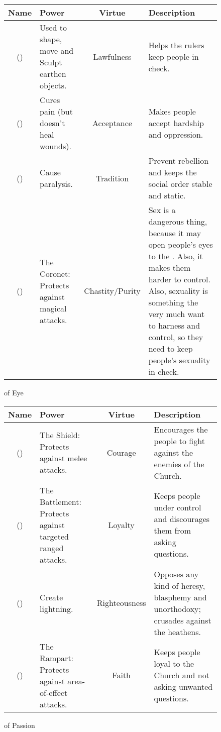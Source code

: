 \newcommand{\sephitem}[5]{#1 (#2) & #3 & #4 & #5 \\\hline}

\newenvironment{sephirahlist}[1]{%
  \begin{figure}
  \caption{\Sephiroth{} of #1}
  \begin{tabular}{|c|p{4cm}|c|p{6cm}|}
  \hline
  \textbf{Name} & \textbf{Power} & \textbf{Virtue} & \textbf{Description} 
  \\
  \hline
  \hline
}{%
  \end{tabular}
  \end{figure}
}





\begin{comment}
\subsubsection{Eye}
\end{comment}
\begin{sephirahlist}{Eye}
\sephitem
  {\Cushed}
  {\male}
  {Used to shape, move and Sculpt earthen objects.}
  {Lawfulness}
  {Helps the rulers keep people in check. }
\sephitem
  {\Omariel}
  {\female}
  {Cures pain (but doesn't heal wounds).}
  {Acceptance}
  {Makes people accept hardship and oppression.}
\sephitem
  {\Yemared}
  {\female}
  {Cause paralysis.}
  {Tradition}
  {Prevent rebellion and keeps the social order stable and static.}
\sephitem
  {\Yeziel}
  {\male}
  {The Coronet: Protects against magical attacks.}
  {Chastity/Purity}
  {Sex is a dangerous thing, because it may open people's eyes to the \hs{Beyond}. Also, it makes them harder to control. Also, \human{} sexuality is something the \banes{} very much want to harness and control, so they need \Yeziel{} to keep people's sexuality in check. }
\end{sephirahlist}




\begin{comment}
\subsubsection{Passion}
\end{comment}
\begin{sephirahlist}{Passion}
\sephitem
  {\Barion}
  {\male}
  {The Shield: Protects against melee attacks.}
  {Courage}
  {Encourages the people to fight against the enemies of the Church.}
\sephitem
  {\Hoshied}
  {\male}
  {The Battlement: Protects against targeted ranged attacks.}
  {Loyalty}
  {Keeps people under control and discourages them from asking questions.}
\sephitem
  {\Razilah}
  {\male}
  {Create lightning.}
  {Righteousness}
  {Opposes any kind of heresy, blasphemy and unorthodoxy; crusades against the heathens.}
\sephitem
  {\Teshiron}
  {\female}
  {The Rampart: Protects against area-of-effect attacks.}
  {Faith}
  {Keeps people loyal to the Church and not asking unwanted questions.}
\end{sephirahlist}





